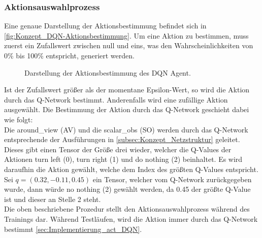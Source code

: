 \subsubsection{Aktionsauswahlprozess} \label{subsubsec:Konzept_Aktionsauswahlprozess_DQN}
Eine genaue Darstellung der Aktionsbestimmung befindet sich in \autoref{fig:Konzept_DQN-Aktionsbestimmung}. Um eine Aktion zu bestimmen, muss zuerst ein Zufallswert zwischen null und eins, was den Wahrscheinlichkeiten von 0\% bis 100\% entspricht, generiert werden.
\begin{figure}[H]
	\centering
	
	\caption[DQN Aktionsbestimmung]{Darstellung der Aktionsbestimmung des DQN Agent.}
	\label{fig:Konzept_DQN-Aktionsbestimmung}
\end{figure}
Ist der Zufallswert größer als der momentane Epsilon-Wert, so wird die Aktion durch das Q-Network bestimmt. Anderenfalls wird eine zufällige Aktion ausgewählt. Die Bestimmung der Aktion durch das Q-Network geschieht dabei wie folgt:\\
Die around\_view (AV) und die scalar\_obs (SO) werden durch das Q-Network entsprechende der Ausführungen in \autoref{subsec:Konzept_Netzstruktur} geleitet. Dieses gibt einen Tensor der Größe drei wieder, welcher die Q-Values der Aktionen turn left (0), turn right (1) und do nothing (2) beinhaltet.
Es wird daraufhin die Aktion gewählt, welche dem Index des größten Q-Values entspricht.\\
Sei $q = (0.32, -0.11, 0.45)$ ein Tensor, welcher vom Q-Network zurückgegeben wurde, dann würde no nothing (2) gewählt werden, da 0.45 der größte Q-Value ist und dieser an Stelle 2 steht.\\
Die oben beschriebene Prozedur stellt den Aktionsauswahlprozess während des Trainings dar. Während Testläufen, wird die Aktion immer durch das Q-Network bestimmt \autoref{sec:Implementierung_act_DQN}.

